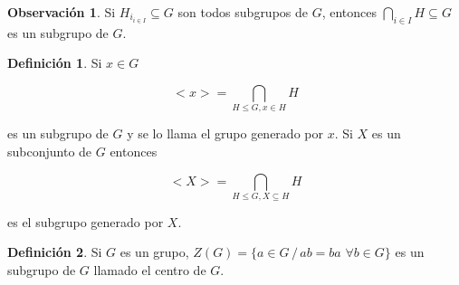 \documentclass{article}
\theoremstyle{definition}
\newtheorem{defn}{Definici\'on}[subsection]
\newtheorem{obs}{Observaci\'on}[subsection]
\begin{document}
\begin{obs}
Si $H_{i_{i \in I}} \subseteq G$ son todos subgrupos de $G$, entonces $\displaystyle \bigcap_{i \in I} H \subseteq G$ es un subgrupo de $G$.
\end{obs}

\begin{defn}
Si $x \in G$

$$<x> = \displaystyle \bigcap_{H \leq G, x \in H} H$$

es un subgrupo de $G$ y se lo llama el grupo generado por $x$. Si $X$ es un subconjunto de $G$ entonces 

$$<X> = \displaystyle \bigcap_{H \leq G, X \subseteq H} H$$

es el subgrupo generado por $X$.
\end{defn}

\begin{defn}
Si $G$ es un grupo, $Z(G) = \{a \in G \, / \, ab = ba \,\, \forall b \in G\}$ es un subgrupo de $G$ llamado el centro de $G$.
\end{defn}
\end{document}
